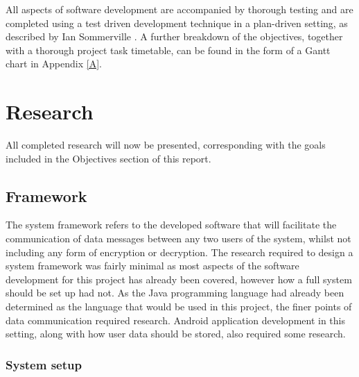 \documentclass[a4paper,10pt]{report}
\begin{document}
All aspects of software development are accompanied by thorough testing and are completed using a test driven development technique in a plan-driven setting, as described by Ian Sommerville \cite{iansommerville}. A further breakdown of the objectives, together with a thorough project task timetable, can be found in the form of a Gantt chart in Appendix \ref{A}.

\chapter{Research}

All completed research will now be presented, corresponding with the goals included in the Objectives section of this report. 

\section{Framework}

The system framework refers to the developed software that will facilitate the communication of data messages between any two users of the system, whilst not including any form of encryption or decryption. The research required to design a system framework was fairly minimal as most aspects of the software development for this project has already been covered, however how a full system should be set up had not. As the Java programming language had already been determined as the language that would be used in this project, the finer points of data communication required research. Android application development in this setting, along with how user data should be stored, also required some research. 

\subsection{System setup}

\end{document}

